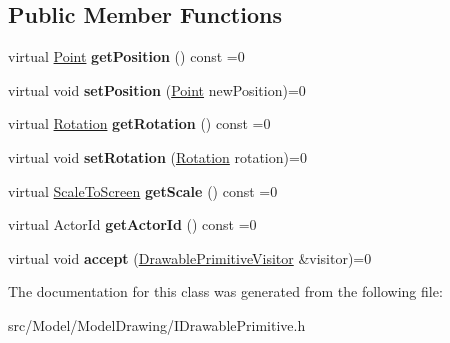 \subsection*{Public Member Functions}
\begin{DoxyCompactItemize}
\item 
virtual \hyperlink{classPoint}{Point} {\bfseries get\+Position} () const  =0\hypertarget{classIDrawablePrimitive_a1366689d9e0fd0e45d24874bf945ef32}{}\label{classIDrawablePrimitive_a1366689d9e0fd0e45d24874bf945ef32}

\item 
virtual void {\bfseries set\+Position} (\hyperlink{classPoint}{Point} new\+Position)=0\hypertarget{classIDrawablePrimitive_a0e43fe084441b21ea58edd28c21dfe0a}{}\label{classIDrawablePrimitive_a0e43fe084441b21ea58edd28c21dfe0a}

\item 
virtual \hyperlink{classRotation}{Rotation} {\bfseries get\+Rotation} () const  =0\hypertarget{classIDrawablePrimitive_a4e43af39ac4628a12d92920f35837874}{}\label{classIDrawablePrimitive_a4e43af39ac4628a12d92920f35837874}

\item 
virtual void {\bfseries set\+Rotation} (\hyperlink{classRotation}{Rotation} rotation)=0\hypertarget{classIDrawablePrimitive_a393a9430549900e517dd0a69677a1be9}{}\label{classIDrawablePrimitive_a393a9430549900e517dd0a69677a1be9}

\item 
virtual \hyperlink{classScaleToScreen}{Scale\+To\+Screen} {\bfseries get\+Scale} () const  =0\hypertarget{classIDrawablePrimitive_aa76cf76b59dc423c4caa1bdaa76d7af7}{}\label{classIDrawablePrimitive_aa76cf76b59dc423c4caa1bdaa76d7af7}

\item 
virtual Actor\+Id {\bfseries get\+Actor\+Id} () const  =0\hypertarget{classIDrawablePrimitive_a233ea34c9d3467841407627457d2a705}{}\label{classIDrawablePrimitive_a233ea34c9d3467841407627457d2a705}

\item 
virtual void {\bfseries accept} (\hyperlink{classDrawablePrimitiveVisitor}{Drawable\+Primitive\+Visitor} \&visitor)=0\hypertarget{classIDrawablePrimitive_af245651a3f3887977a1a9db2f0cf62e8}{}\label{classIDrawablePrimitive_af245651a3f3887977a1a9db2f0cf62e8}

\end{DoxyCompactItemize}


The documentation for this class was generated from the following file\+:\begin{DoxyCompactItemize}
\item 
src/\+Model/\+Model\+Drawing/I\+Drawable\+Primitive.\+h\end{DoxyCompactItemize}
